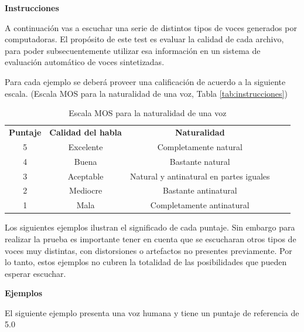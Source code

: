\large{\textbf{Instrucciones}}

\normalsize

A continuación vas a escuchar una serie de distintos tipos de voces generados por computadoras. El propósito de este test es evaluar la calidad de cada archivo, para poder subsecuentemente utilizar esa información en un sistema de evaluación automático de voces sintetizadas.

Para cada ejemplo se deberá proveer una calificación de acuerdo a la siguiente escala. (Escala MOS para la naturalidad de una voz, Tabla \eqref{tab:instrucciones})

\begin{table}[H]
\centering
\caption{Escala MOS para la naturalidad de una voz}
\label{tab:instrucciones}
\begin{tabular}{cccll}
\textbf{Puntaje} & \textbf{Calidad del habla} & \textbf{Naturalidad}                    &  &  \\ \cline{1-3}
5                & Excelente                  & Completamente natural                   &  &  \\
4                & Buena                      & Bastante natural                        &  &  \\
3                & Aceptable                  & Natural y antinatural en partes iguales &  &  \\
2                & Mediocre                   & Bastante antinatural                    &  &  \\
1                & Mala                       & Completamente antinatural               &  & 
\end{tabular}
\end{table}

Los siguientes ejemplos ilustran el significado de cada puntaje. Sin embargo para realizar la prueba es importante tener en cuenta que se escucharan otros tipos de voces muy distintas, con distorsiones o artefactos no presentes previamente. Por lo tanto, estos ejemplos no cubren la totalidad de las posibilidades  que pueden esperar escuchar.

\large{\textbf{Ejemplos}}

\normalsize

El siguiente ejemplo presenta una voz humana y tiene un puntaje de referencia de 5.0

